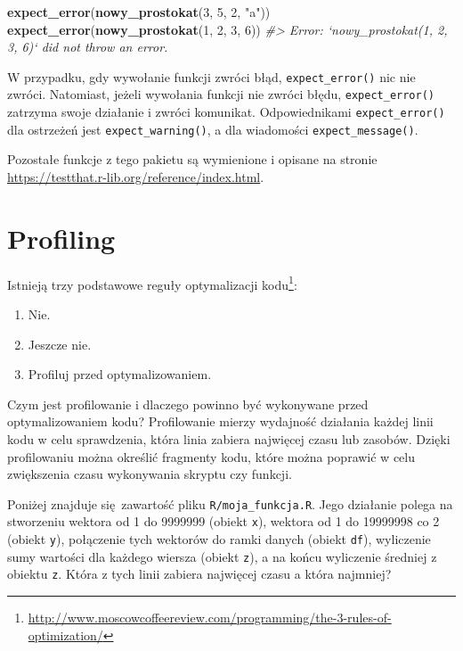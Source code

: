 \documentclass[paper=6in:9in,pagesize=pdftex,headinclude=on,footinclude=on,10pt]{scrbook}
\newenvironment{Shaded}{\begin{snugshade}}{\end{snugshade}}
\newcommand{\CommentTok}[1]{\textcolor[rgb]{0.56,0.35,0.01}{\textit{#1}}}
\newcommand{\DecValTok}[1]{\textcolor[rgb]{0.00,0.00,0.81}{#1}}
\newcommand{\KeywordTok}[1]{\textcolor[rgb]{0.13,0.29,0.53}{\textbf{#1}}}
\newcommand{\NormalTok}[1]{#1}
\newcommand{\StringTok}[1]{\textcolor[rgb]{0.31,0.60,0.02}{#1}}
\providecommand{\tightlist}{%
  \setlength{\itemsep}{0pt}\setlength{\parskip}{0pt}}
\begin{document}
\begin{Shaded}
\begin{Highlighting}[]
\KeywordTok{expect_error}\NormalTok{(}\KeywordTok{nowy_prostokat}\NormalTok{(}\DecValTok{3}\NormalTok{, }\DecValTok{5}\NormalTok{, }\DecValTok{2}\NormalTok{, }\StringTok{"a"}\NormalTok{))}
\KeywordTok{expect_error}\NormalTok{(}\KeywordTok{nowy_prostokat}\NormalTok{(}\DecValTok{1}\NormalTok{, }\DecValTok{2}\NormalTok{, }\DecValTok{3}\NormalTok{, }\DecValTok{6}\NormalTok{))}
\CommentTok{#> Error: `nowy_prostokat(1, 2, 3, 6)` did not throw an error.}
\end{Highlighting}
\end{Shaded}

W przypadku, gdy wywołanie funkcji zwróci błąd, \texttt{expect\_error()} nic nie zwróci.
Natomiast, jeżeli wywołania funkcji nie zwróci błędu, \texttt{expect\_error()} zatrzyma swoje działanie i zwróci komunikat.
Odpowiednikami \texttt{expect\_error()} dla ostrzeżeń jest \texttt{expect\_warning()}, a dla wiadomości \texttt{expect\_message()}.

Pozostałe funkcje z tego pakietu są wymienione i opisane na stronie \url{https://testthat.r-lib.org/reference/index.html}.

\hypertarget{profiling}{%
\section{Profiling}\label{profiling}}

Istnieją trzy podstawowe reguły optymalizacji kodu\footnote{\url{http://www.moscowcoffeereview.com/programming/the-3-rules-of-optimization/}}:

\begin{enumerate}
\def\labelenumi{\arabic{enumi}.}
\tightlist
\item
  Nie.
\item
  Jeszcze nie.
\item
  Profiluj przed optymalizowaniem.
\end{enumerate}

Czym jest profilowanie i dlaczego powinno być wykonywane przed optymalizowaniem kodu?
Profilowanie mierzy wydajność działania każdej linii kodu w celu sprawdzenia, która linia zabiera najwięcej czasu lub zasobów.
Dzięki profilowaniu można określić fragmenty kodu, które można poprawić w celu zwiększenia czasu wykonywania skryptu czy funkcji.

Poniżej znajduje się~zawartość pliku \texttt{R/moja\_funkcja.R}.
Jego działanie polega na stworzeniu wektora od 1 do 9999999 (obiekt \texttt{x}), wektora od 1 do 19999998 co 2 (obiekt \texttt{y}), połączenie tych wektorów do ramki danych (obiekt \texttt{df}), wyliczenie sumy wartości dla każdego wiersza (obiekt \texttt{z}), a na końcu wyliczenie średniej z obiektu \texttt{z}.
Która z tych linii zabiera najwięcej czasu a która najmniej?
\end{document}
